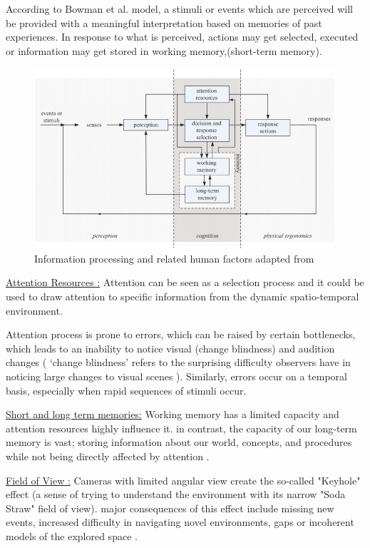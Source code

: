 According to Bowman et al. \cite{Bowman:2004:UIT:993837} model, a stimuli or events which are perceived will be provided with a meaningful interpretation based on memories of past experiences. In response to what is perceived, actions may get selected, executed or information may get stored in working memory,(short-term memory).

\begin{figure}
     \includegraphics[width=1\textwidth]{images/Info_proc.png}
    \caption{Information processing and related human factors adapted from \cite{PMID:11540969}}
    \centering
    \label{Info Processing}
\end{figure}


\underline { Attention Resources :} Attention can be seen as a selection process and it could be used to draw attention to specific information from the dynamic spatio-temporal environment.

Attention process is prone to errors, which can be raised by certain bottlenecks, which leads to an inability to notice visual (change blindness) and audition changes ( ‘change blindness’ refers to the surprising difficulty observers have in noticing large changes to visual scenes \cite{SIMONS200516}). Similarly, errors occur on a temporal basis, especially when rapid sequences of stimuli occur.

\underline {Short and long term memories:} 
Working memory has a limited capacity and attention resources highly influence it. in contrast, the capacity of our long-term memory is vast; storing information about our world, concepts, and procedures while not being directly affected by attention \cite{Bowman:2004:UIT:993837}.

\underline {Field of View :} 
Cameras with limited angular view create the so-called "Keyhole" effect (a sense of trying to understand the environment with its narrow "Soda Straw" field of view). major consequences of this effect include missing new events, increased difficulty in navigating novel environments, gaps or incoherent models of the explored space \cite{woods2004envisioning}.

